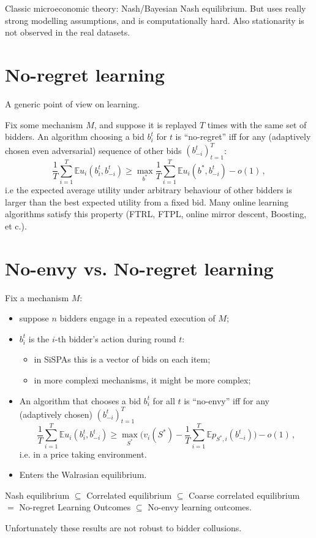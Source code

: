\documentclass[a4paper]{article}
\newcommand{\ex}{\mathbb{E}}
\begin{document}
Classic microeconomic theory: Nash/Bayesian Nash equilibrium. But uses really strong
modelling assumptions, and is computationally hard. Also stationarity is not observed
in the real datasets.


\section{No-regret learning} %
\label{sec:no_regret_learning}
\noindent A generic point of view on learning.

Fix some mechanism $M$, and suppose it is replayed $T$ times with the same set of
bidders. An algorithm choosing a bid $b_i^t$ for $t$ is ``no-regret'' iff for any
(adaptively chosen even adversarial) sequence of other bids $(b_{-i}^t)_{t=1}^T$:
\begin{equation}
	\frac{1}{T} \sum_{i=1}^T \ex u_i(b_i^t, b_{-i}^t)
		\geq \max_{b^*} \frac{1}{T} \sum_{i=1}^T \ex u_i(b^*, b_{-i}^t) - o(1)
		\,,
\end{equation}
i.e the expected average utility under arbitrary behaviour of other bidders is larger
than the best expected utility from a fixed bid. Many online learning algorithms satisfy
this property (FTRL, FTPL, online mirror descent, Boosting, et c.).



\section{No-envy vs. No-regret learning} %
\label{sec:no_envy_vs_no_regret_learning}

Fix a mechanism $M$: \begin{itemize}
	\item suppose $n$ bidders engage in a repeated execution of $M$;
	\item $b_i^t$ is the $i$-th bidder's action during round $t$: \begin{itemize}
		\item in SiSPAs this is a vector of bids on each item;
		\item in more complexi mechanisms, it might be more complex;
	\end{itemize}
	\item An algorithm that chooses a bid $b_i^t$ for all $t$ is ``no-envy'' iff
	for any (adaptively chosen) $(b_{-i}^t)_{t=1}^T$
	\begin{equation}
		\frac{1}{T} \sum_{i=1}^T \ex u_i(b_i^t, b_{-i}^t)
			\geq \max_{S^*} \bigl(v_i(S^*) - \frac{1}{T} \sum_{i=1}^T \ex p_{S^*,i}(b_{-i}^t) \bigr)
			- o(1) \,,
	\end{equation}
	i.e. in a price taking environment.
	\item Enters the Walrasian equilibrium.
\end{itemize}

Nash equilibrium $\subseteq$
Correlated equilibrium $\subseteq$
Coarse correlated equilibrium $=$
No-regret Learning Outcomes $\subseteq$
No-envy learning outcomes.

Unfortunately these results are not robust to bidder collusions.

\end{document}
